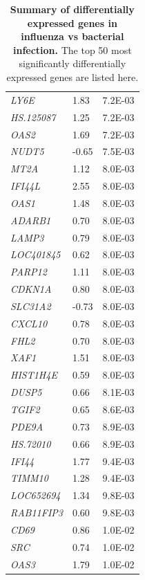 \begin{table}[]
\begin{center}
{\begin{tabular}{lll}
\textit{LY6E}      & 1.83                       & 7.2E-03      \\
\textit{HS.125087} & 1.25                       & 7.2E-03      \\
\textit{OAS2}      & 1.69                       & 7.2E-03      \\
\textit{NUDT5}     & -0.65                      & 7.5E-03      \\
\textit{MT2A}      & 1.12                       & 8.0E-03      \\
\textit{IFI44L}    & 2.55                       & 8.0E-03      \\
\textit{OAS1}      & 1.48                       & 8.0E-03      \\
\textit{ADARB1}    & 0.70                       & 8.0E-03      \\
\textit{LAMP3}     & 0.79                       & 8.0E-03      \\
\textit{LOC401845} & 0.62                       & 8.0E-03      \\
\textit{PARP12}    & 1.11                       & 8.0E-03      \\
\textit{CDKN1A}    & 0.80                       & 8.0E-03      \\
\textit{SLC31A2}   & -0.73                      & 8.0E-03      \\
\textit{CXCL10}    & 0.78                       & 8.0E-03      \\
\textit{FHL2}      & 0.70                       & 8.0E-03      \\
\textit{XAF1}      & 1.51                       & 8.0E-03      \\
\textit{HIST1H4E}  & 0.59                       & 8.0E-03      \\
\textit{DUSP5}     & 0.66                       & 8.1E-03      \\
\textit{TGIF2}     & 0.65                       & 8.6E-03      \\
\textit{PDE9A}     & 0.73                       & 8.9E-03      \\
\textit{HS.72010}  & 0.66                       & 8.9E-03      \\
\textit{IFI44}     & 1.77                       & 9.4E-03      \\
\textit{TIMM10}    & 1.28                       & 9.4E-03      \\
\textit{LOC652694} & 1.34                       & 9.8E-03      \\
\textit{RAB11FIP3} & 0.60                       & 9.8E-03      \\
\textit{CD69}      & 0.86                       & 1.0E-02      \\
\textit{SRC}       & 0.74                       & 1.0E-02      \\
\textit{OAS3}      & 1.79                       & 1.0E-02     
\end{tabular}}
\end{center}
\caption[Differentially expressed genes in influenza infection]{\textbf{Summary of differentially expressed genes in influenza vs bacterial infection.} The top 50 most significantly differentially expressed genes are listed here.}
\label{tab:flu-de-genes}
\end{table}